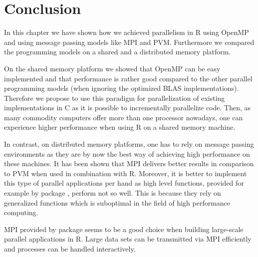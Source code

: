 

\section{Conclusion}

In this chapter we have shown how we achieved parallelism in R
using OpenMP and using message passing models like MPI and
PVM. Furthermore we compared the programming models on a shared and a
distributed memory platform.

On the shared memory platform we showed that OpenMP can be easy
implemented and that performance is rather good compared to the other
parallel programming models (when ignoring the optimized BLAS
implementations). Therefore we propose to use this paradigm for
parallelization of existing implementations in C as it is possible to
incrementally parallelize code. Then, as many commodity computers
offer more than one processor nowadays, one can experience higher
performance when using R on a shared memory machine.

In contrast, on distributed memory platforms, one has to rely on
message passing environments as they are by now the best way of
achieving high performance on these machines. It has been shown that
MPI delivers better results in comparison to PVM when used in
combination with R. Moreover, it is better to implement this type of
parallel applications per hand as high level functions, provided for
example by package , perform not so well. This is because
they rely on generalized functions which is suboptimal in the field of
high performance computing.

MPI provided by package  seems to be a good choice when
building large-scale parallel applications in R. Large data sets can
be transmitted via MPI efficiently and processes can be handled
interactively.


%
